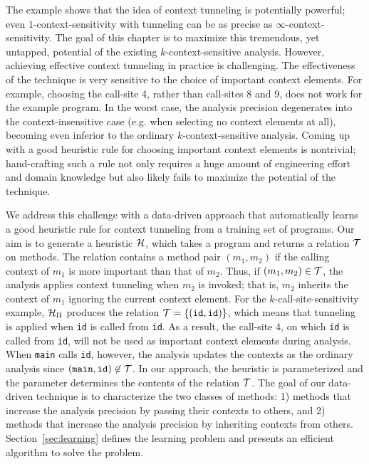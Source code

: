 The example shows that the idea of context tunneling is potentially
powerful; even $1$-context-sensitivity with
tunneling can be as precise as
$\infty$-context-sensitivity. The goal of this chapter is to maximize
this tremendous, yet untapped, potential of the existing $k$-context-sensitive analysis.
However, achieving effective context tunneling in practice is
challenging. The effectiveness of the technique is very sensitive
to the choice of important context elements.  For example,
choosing the call-site 4, rather than call-sites 8 and 9, does not
work for the example program.  In the worst case, the analysis
precision degenerates into the context-insensitive case (e.g. when
selecting no context elements at all), becoming even inferior to the
ordinary
$k$-context-sensitive analysis.  Coming up with a good
heuristic rule for choosing important context elements is nontrivial;
hand-crafting such a rule not only requires a huge amount of
engineering effort and domain knowledge but also likely fails to
maximize the potential of the technique.




We address this challenge with a data-driven approach that
automatically learns a good heuristic rule for context tunneling from
a training set of programs.
Our aim is to generate a heuristic $\mathcal{H}$,
which takes a program and returns a relation $\mathcal{T}$ on methods.
The relation contains a method pair $(m_1, m_2)$ if the calling context of
$m_1$ is more important than that of $m_2$. Thus, if $(m_1, m_2) \in
\mathcal{T}$, the analysis applies context tunneling when $m_2$ is
invoked; that is, $m_2$ inherits the context of $m_1$ ignoring the current
context element. For the $k$-call-site-sensitivity example, $\mathcal{H}_\Pi$
produces the relation $\mathcal{T} = \{ ({\tt id}, {\tt id}) \}$,
which means that tunneling is applied when {\tt id} is called from {\tt id}.
As a result, the call-site 4, on which {\tt id} is called from {\tt id}, will
not be used as important context elements during analysis.  When {\tt main}
calls {\tt id}, however, the analysis updates the contexts as the ordinary
analysis since $({\tt main}, {\tt id}) \not\in \mathcal{T}$.  In our
approach, the heuristic is parameterized and the parameter determines the
contents of the relation $\mathcal{T}$.  The goal of our data-driven
technique is to characterize the two classes of methods: 1) methods that
increase the analysis precision by passing their contexts to others, and 2)
methods that increase the analysis precision by inheriting contexts from
others. Section~\ref{sec:learning} defines the learning problem and presents
an efficient algorithm to solve the problem.


